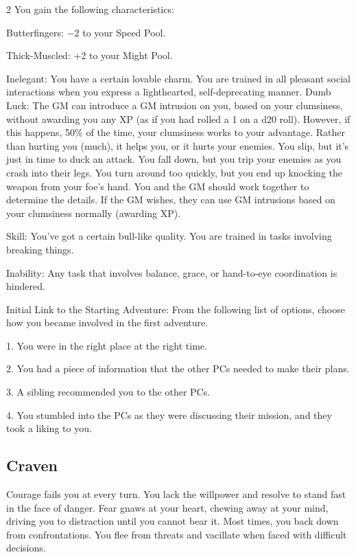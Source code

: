 \begin{multicols}{2}
You gain the following characteristics:

Butterfingers: −2 to your Speed Pool.

Thick-Muscled: +2 to your Might Pool.

Inelegant: You have a certain lovable charm. You are trained in all pleasant social interactions when you express a lighthearted, self-deprecating manner.
Dumb Luck: The GM can introduce a GM intrusion on you, based on your clumsiness, without awarding you any XP (as if you had rolled a 1 on a d20 roll). However, if this happens, 50\% of the time, your clumsiness works to your advantage. Rather than hurting you (much), it helps you, or it hurts your enemies. You slip, but it’s just in time to duck an attack. You fall down, but you trip your enemies as you crash into their legs. You turn around too quickly, but you end up knocking the weapon from your foe’s hand. You and the GM should work together to determine the details. If the GM wishes, they can use GM intrusions based on your clumsiness normally (awarding XP).

Skill: You’ve got a certain bull-like quality. You are trained in tasks involving breaking things.

Inability: Any task that involves balance, grace, or hand-to-eye coordination is hindered.

Initial Link to the Starting Adventure: From the following list of options, choose how you became involved in the first adventure.

1. You were in the right place at the right time.

2. You had a piece of information that the other PCs needed to make their plans.

3. A sibling recommended you to the other PCs.

4. You stumbled into the PCs as they were discussing their mission, and they took a liking to you.

\subsection{Craven}

Courage fails you at every turn. You lack the willpower and resolve to stand fast in the face of danger. Fear gnaws at your heart, chewing away at your mind, driving you to distraction until you cannot bear it. Most times, you back down from confrontations. You flee from threats and vacillate when faced with difficult decisions.


\end{multicols}
